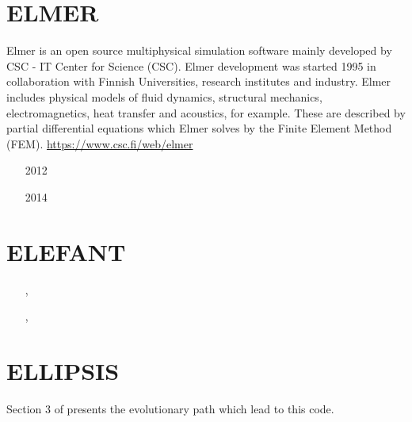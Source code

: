 \section{ELMER} 
Elmer is an open source multiphysical simulation software mainly developed by 
CSC - IT Center for Science (CSC). Elmer development was started 1995 
in collaboration with Finnish Universities, research institutes and industry. 
Elmer includes physical models of 
fluid dynamics, structural mechanics, electromagnetics, heat transfer and acoustics, 
for example. These are described by partial differential equations which Elmer solves 
by the Finite Element Method (FEM). \url{https://www.csc.fi/web/elmer}

\begin{small}
\begin{itemize}
\item[2012] \cite{maierova}
\item[2014] \cite{mals14}
\end{itemize}
\end{small}


\section{ELEFANT}

\begin{small}
\begin{itemize}
\item[\twothousandfifteen]   \textcite{tosn15},  \textcite{matv15}
\item[\twothousandsixteen]   \textcite{busa16}
\item[\twothousandseventeen] \textcite{thie17},  \textcite{latb17}
\item[\twothousandeighteen]  \textcite{pltv18}
\item[\twothousandnineteen]  \textcite{frtv19}
\end{itemize}
\end{small}

\section{ELLIPSIS} 
Section 3 of \cite{qums07} presents the evolutionary path which lead to this code.

